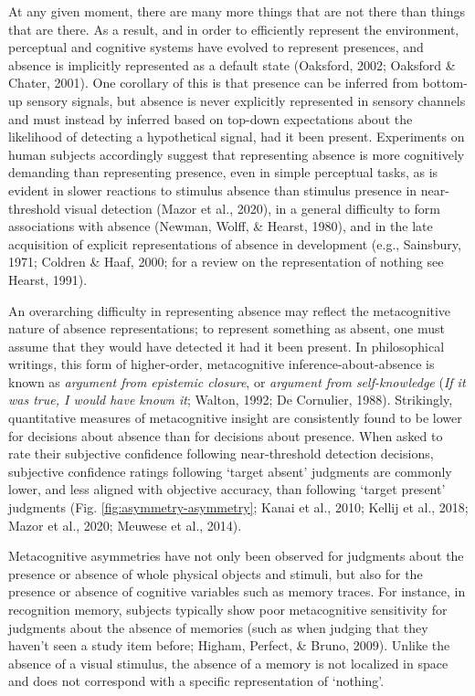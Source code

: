 \documentclass[12pt,twoside]{reedthesis}
\begin{document}
At any given moment, there are many more things that are not there than things that are there. As a result, and in order to efficiently represent the environment, perceptual and cognitive systems have evolved to represent presences, and absence is implicitly represented as a default state (Oaksford, 2002; Oaksford \& Chater, 2001). One corollary of this is that presence can be inferred from bottom-up sensory signals, but absence is never explicitly represented in sensory channels and must instead by inferred based on top-down expectations about the likelihood of detecting a hypothetical signal, had it been present. Experiments on human subjects accordingly suggest that representing absence is more cognitively demanding than representing presence, even in simple perceptual tasks, as is evident in slower reactions to stimulus absence than stimulus presence in near-threshold visual detection (Mazor et al., 2020), in a general difficulty to form associations with absence (Newman, Wolff, \& Hearst, 1980), and in the late acquisition of explicit representations of absence in development (e.g., Sainsbury, 1971; Coldren \& Haaf, 2000; for a review on the representation of nothing see Hearst, 1991).

An overarching difficulty in representing absence may reflect the metacognitive nature of absence representations; to represent something as absent, one must assume that they would have detected it had it been present. In philosophical writings, this form of higher-order, metacognitive inference-about-absence is known as \emph{argument from epistemic closure}, or \emph{argument from self-knowledge} (\emph{If it was true, I would have known it}; Walton, 1992; De Cornulier, 1988). Strikingly, quantitative measures of metacognitive insight are consistently found to be lower for decisions about absence than for decisions about presence. When asked to rate their subjective confidence following near-threshold detection decisions, subjective confidence ratings following `target absent' judgments are commonly lower, and less aligned with objective accuracy, than following `target present' judgments (Fig. \ref{fig:asymmetry-asymmetry}; Kanai et al., 2010; Kellij et al., 2018; Mazor et al., 2020; Meuwese et al., 2014).

Metacognitive asymmetries have not only been observed for judgments about the presence or absence of whole physical objects and stimuli, but also for the presence or absence of cognitive variables such as memory traces. For instance, in recognition memory, subjects typically show poor metacognitive sensitivity for judgments about the absence of memories (such as when judging that they haven't seen a study item before; Higham, Perfect, \& Bruno, 2009). Unlike the absence of a visual stimulus, the absence of a memory is not localized in space and does not correspond with a specific representation of `nothing'.
\end{document}
